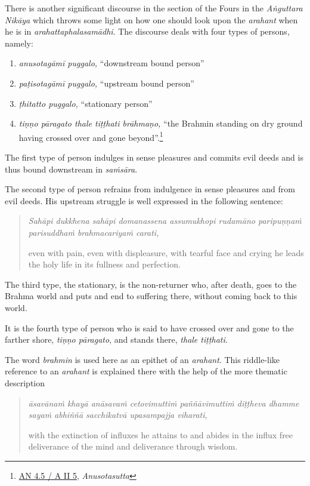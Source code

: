 There is another significant discourse in the section of the Fours in the \emph{Aṅguttara Nikāya} which throws some light on how one should look upon the \emph{arahant} when he is in \emph{arahattaphalasamādhi}. The discourse deals with four types of persons, namely:

\begin{enumerate}
\def\labelenumi{\arabic{enumi}.}
\tightlist
\item
  \emph{anusotagāmī puggalo,} ``downstream bound person''
\item
  \emph{paṭisotagāmī puggalo,} ``upstream bound person''
\item
  \emph{ṭhitatto puggalo,} ``stationary person''
\item
  \emph{tiṇṇo pāragato thale tiṭṭhati brāhmaṇo,} ``the Brahmin standing on dry ground having crossed over and gone beyond''.\footnote{\href{https://suttacentral.net/an4.5/pli/ms}{AN 4.5 / A II 5}, \emph{Anusotasutta}}
\end{enumerate}

The first type of person indulges in sense pleasures and commits evil deeds and is thus bound downstream in \emph{saṁsāra}.

The second type of person refrains from indulgence in sense pleasures and from evil deeds. His upstream struggle is well expressed in the following sentence:

\begin{quote}
\emph{Sahāpi dukkhena sahāpi domanassena assumukhopi rudamāno paripuṇṇaṁ parisuddhaṁ brahmacariyaṁ carati,}

even with pain, even with displeasure, with tearful face and crying he leads the holy life in its fullness and perfection.
\end{quote}

The third type, the stationary, is the non-returner who, after death, goes to the Brahma world and puts and end to suffering there, without coming back to this world.

It is the fourth type of person who is said to have crossed over and gone to the farther shore, \emph{tiṇṇo pāragato}, and stands there, \emph{thale tiṭṭhati}.

The word \emph{brahmin} is used here as an epithet of an \emph{arahant}. This riddle-like reference to an \emph{arahant} is explained there with the help of the more thematic description

\begin{quote}
\emph{āsavānaṁ khayā anāsavaṁ cetovimuttiṁ paññāvimuttiṁ diṭṭheva dhamme sayaṁ abhiññā sacchikatvā upasampajja viharati},

with the extinction of influxes he attains to and abides in the influx free deliverance of the mind and deliverance through wisdom.
\end{quote}

